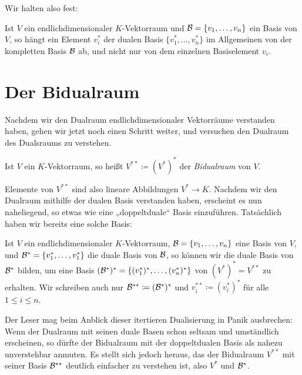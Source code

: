 \documentclass[a4paper,10pt]{article}
\begin{document}
Wir halten also fest:

\begin{shaded}
 Ist $V$ ein endlichdimensionaler $K$-Vektorraum und $\mathcal{B} = \{v_1, \dotsc, v_n\}$ ein Basis von $V$, so hängt ein Element $v_i^*$ der dualen Basis $\{v_1^*, \dotsc, v_n^*\}$ im Allgemeinen von der kompletten Basis $\mathcal{B}$ ab, und nicht nur von dem einzelnen Basiselement $v_i$.
\end{shaded}










\section{Der Bidualraum}
Nachdem wir den Dualraum endlichdimensionaler Vektorräume verstanden haben, gehen wir jetzt noch einen Schritt weiter, und versuchen den Dualraum des Dualsraums zu verstehen.

\begin{defi}
 Ist $V$ ein $K$-Vektorraum, so heißt $V^{**} \coloneqq (V^*)^*$ der \emph{Bidualraum} von $V$.
\end{defi}

Elemente von $V^{**}$ sind also lineare Abbildungen $V^* \to K$. Nachdem wir den Dualraum mithilfe der dualen Basis verstanden haben, erscheint es nun naheliegend, so etwas wie eine „doppeltduale“ Basis einzuführen. Tatsächlich haben wir bereits eine solche Basis:

Ist $V$ ein endlichdimensionaler $K$-Vektorraum, $\mathcal{B} = \{v_1, \dotsc, v_n\}$ eine Basis von $V$, und $\mathcal{B}^* = \{v_1^*, \dotsc, v_1^*\}$ die duale Basis von $\mathcal{B}$, so können wir die duale Basis von $\mathcal{B}^*$ bilden, um eine Basis $(\mathcal{B}^*)^* = \{(v_1^*)^*, \dotsc, (v_n^*)^*\}$ von $(V^*)^* = V^{**}$ zu erhalten. Wir schreiben auch nur $\mathcal{B}^{**} \coloneqq (\mathcal{B}^*)^*$ und $v_i^{**} \coloneqq (v_i^*)^*$ für alle $1 \leq i \leq n$.

Der Leser mag beim Anblick dieser itertieren Dualisierung in Panik ausbrechen: Wenn der Dualraum mit seinen duale Basen schon seltsam und umständlich erscheinen, so dürfte der Bidualraum mit der doppeltdualen Basis als nahezu unverstehbar anmuten. Es stellt sich jedoch heraus, das der Bidualraum $V^{**}$ mit seiner Basis $\mathcal{B}^{**}$ deutlich einfacher zu verstehen ist, also $V^*$ und $\mathcal{B}^*$.
\end{document}
